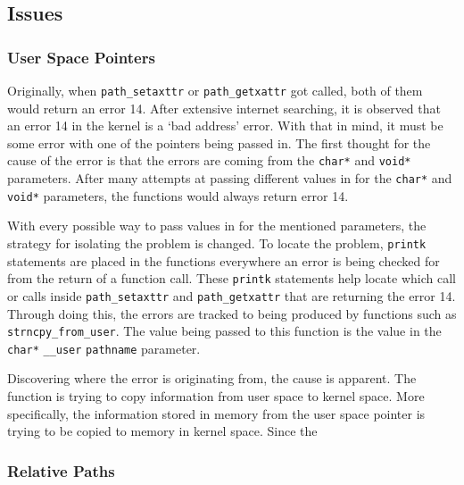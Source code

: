 \subsection{Issues}
\subsubsection*{User Space Pointers}
Originally, when \texttt{path\_setaxttr} or \texttt{path\_getxattr} got called, both of them would return an error 14. After extensive internet searching, it is observed that an error 14 in the kernel is a `bad address' error. With that in mind, it must be some error with one of the pointers being passed in. The first thought for the cause of the error is that the errors are coming from the \texttt{char*} and \texttt{void*} parameters. After many attempts at passing different values in for the \texttt{char*} and \texttt{void*} parameters, the functions would always return error 14. 

With every possible way to pass values in for the mentioned parameters, the strategy for isolating the problem is changed. To locate the problem, \texttt{printk} statements are placed in the functions everywhere an error is being checked for from the return of a function call. These \texttt{printk} statements help locate which call or calls inside \texttt{path\_setaxttr} and \texttt{path\_getxattr} that are returning the error 14. Through doing this, the errors are tracked to being produced by functions such as \texttt{strncpy\_from\_user}. The value being passed to this function is the value in the \texttt{char*} \texttt{\_\_user} \texttt{pathname} parameter. 

Discovering where the error is originating from, the cause is apparent. The function is trying to copy information from user space to kernel space. More specifically, the information stored in memory from the user space pointer is trying to be copied to memory in kernel space. Since the 
\subsubsection*{Relative Paths}